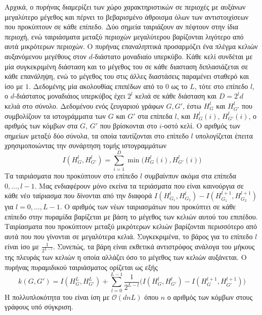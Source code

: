 Αρχικά, ο πυρήνας διαμερίζει των χώρο χαρακτηριστικών σε περιοχές με αυξάνων μεγαλύτερο μέγεθος και πέρνει το βεβαρισμένο άθροισμα όλων των αντιστοιχίσεων που προκύπτουν σε κάθε επίπεδο.
Δύο σημεία ταιριάζουν αν πέφτουν στην ίδια περιοχή, ενώ ταιριάσματα μεταξύ περιοχών μεγαλύτερου βαρίζονται λιγότερο από αυτά μικρότερων περιοχών.
Ο πυρήνας επαναληπτικά προσαρμόζει ένα πλέγμα κελιών αυξανόμενου μεγέθους στον $d$-διάστατο μοναδιαίο υπερκύβο.
Κάθε κελί συνδέται με μία συγκεκριμένη διάσταση και το μέγεθος του σε κάθε διασταση διπλασιάζεται σε κάθε επανάληψη, ενώ το μέγεθος του στις άλλες διαστάσεις παραμένει σταθερό και ίσο με $1$.
Δεδομένης μία ακολουθίας επιπέδων από το $0$ ως το $L$, τότε στο επίπεδο $l$, ο $d$-διάστατος μοναδιάιος υπερκύβος έχει $2^l$ κελιά σε κάθε διάσταση και $D = 2^{l}d$ κελιά στο σύνολο.
Δεδομένου ενός ζευγαριού γράφων $G,G'$, έστω $H_G^l$ και $H_{G'}^l$ που συμβολίζουν τα ιστογράμματα των $G$ και $G'$ στα επίπεδα $l$, και $H_G^l(i)$, $H_{G'}^l(i)$, ο αριθμός των κόμβων στα $G$, $G'$ που βρίσκονται στο $i$-οστό κελί.
Ο αριθμός των σημείων μεταξύ δύο σύνολα, τα οποία ταυτίζονται στο επίπεδο $l$ υπολογίζεται έπειτα χρησιμοποιώντας την συνάρτηση τομής ιστογραμμάτων
\begin{equation}
  I(H_G^l,H_{G'}^l) = \sum_{i=1}^D \min\big(H_G^l(i),H_{G'}^l(i)\big)
\end{equation}
Τα ταιριάσματα που προκύπτουν στο επίπεδο $l$ συμβαίνπυν ακόμα στα επίπεδα $0, \ldots, l-1$.
Μας ενδιαφέρουν μόνο εκείνα τα τεριάσματα που είναι καινούργια σε κάθε νέο ταίριασμα που δίνονται από την διαφορά $I(H_{G_1}^l,H_{G_2}^l) - I(H_{G_1}^{l+1},H_{G_2}^{l+1})$ για $l=0,\ldots,L-1$.
Ο αριθμός των νέων ταιριασμάτων που προκύπτει σε κάθε επίπεδο στην πυραμίδα βαρίζεται με βάση το μέγεθος των κελιών αυτού του επιπέδου.
Ταιρίασματα που προκύπτουν μεταξύ μικρότερων κελιών βαρίζονται περισσότερο από αυτά που που γίνονται σε μεγαλύτερα κελιά.
Συγκεκριμένα, το βάρος για το επίπεδο $l$ είναι ίσο με $\frac{1}{2^{L-l}}$.
Συνεπώς, τα βάρη είναι εκθετικά αντιστρόφος ανάλογα του μήκους της πλευράς των κελιών η οποία αλλάζει όσο το μέγεθος των κελιών αυξάνεται.
Ο πυρήνας πυραμιδικού ταιριάσματος ορίζεται ως εξής
\begin{equation}
  k(G,G') = I(H_G^L,H_{G'}^L) + \sum_{l=0}^{L-1} \frac{1}{2^{L-l}}\big(I(H_G^l,H_{G'}^l) - I(H_G^{l+1},H_{G'}^{l+1})\big)
\end{equation} 
Η πολλυπλοκότητα του είναι ίση με $\mathcal{O}(dnL)$ όπου $n$ ο αριθμός των κόμβων στους γράφους υπό σύγκριση.

